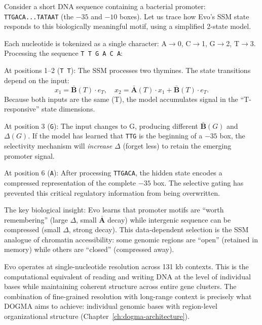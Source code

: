 \begin{example}
Consider a short DNA sequence containing a bacterial promoter: \texttt{TTGACA...TATAAT} (the $-35$ and $-10$ boxes). Let us trace how Evo's SSM state responds to this biologically meaningful motif, using a simplified 2-state model.

Each nucleotide is tokenized as a single character: A$\to$0, C$\to$1, G$\to$2, T$\to$3. Processing the sequence \texttt{T T G A C A}:

At positions 1--2 (\texttt{T T}): The SSM processes two thymines. The state transitions depend on the input:
\[
x_1 = \bar{\mathbf{B}}(T) \cdot e_T, \quad x_2 = \bar{\mathbf{A}}(T) \cdot x_1 + \bar{\mathbf{B}}(T) \cdot e_T.
\]
Because both inputs are the same (T), the model accumulates signal in the ``T-responsive'' state dimensions.

At position 3 (\texttt{G}): The input changes to G, producing different $\bar{\mathbf{B}}(G)$ and $\Delta(G)$. If the model has learned that \texttt{TTG} is the beginning of a $-35$ box, the selectivity mechanism will \emph{increase $\Delta$} (forget less) to retain the emerging promoter signal.

At position 6 (\texttt{A}): After processing \texttt{TTGACA}, the hidden state encodes a compressed representation of the complete $-35$ box. The selective gating has prevented this critical regulatory information from being overwritten.

The key biological insight: Evo learns that promoter motifs are ``worth remembering'' (large $\Delta$, small $\bar{\mathbf{A}}$ decay) while intergenic sequence can be compressed (small $\Delta$, strong decay). This data-dependent selection is the SSM analogue of chromatin accessibility: some genomic regions are ``open'' (retained in memory) while others are ``closed'' (compressed away).
\end{example}

\begin{keyinsight}
Evo operates at single-nucleotide resolution across 131 kb contexts. This is the computational equivalent of reading and writing DNA at the level of individual bases while maintaining coherent structure across entire gene clusters. The combination of fine-grained resolution with long-range context is precisely what DOGMA aims to achieve: individual genomic bases with region-level organizational structure (Chapter~\ref{ch:dogma-architecture}).
\end{keyinsight}

